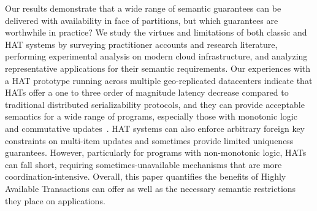 Our results demonstrate that a wide range of semantic guarantees can
be delivered with availability in face of partitions, but which
guarantees are worthwhile in practice? We study the virtues and
limitations of both classic and HAT systems by surveying practitioner
accounts and research literature, performing experimental analysis on
modern cloud infrastructure, and analyzing representative applications
for their semantic requirements. Our experiences with a HAT prototype
running across multiple geo-replicated datacenters indicate that HATs
offer a one to three order of magnitude latency decrease compared to
traditional distributed serializability protocols, and they can
provide acceptable semantics for a wide range of programs, especially
those with monotonic logic and commutative updates~\cite{calm, crdt}. HAT systems can also enforce arbitrary foreign key
constraints on multi-item updates and sometimes provide limited
uniqueness guarantees. However, particularly for programs with
non-monotonic logic, HATs can fall short, requiring
sometimes-unavailable mechanisms that are more
coordination-intensive. Overall, this paper quantifies the benefits of
Highly Available Transactions can offer as well as the necessary
semantic restrictions they place on applications.




